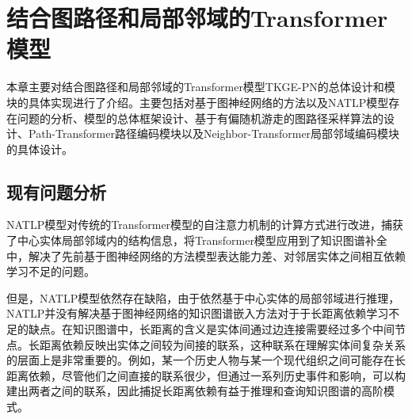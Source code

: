 \chapter{结合图路径和局部邻域的Transformer模型}

本章主要对结合图路径和局部邻域的Transformer模型TKGE-PN的总体设计和模块的具体实现进行了介绍。主要包括对基于图神经网络的方法以及NATLP模型存在问题的分析、模型的总体框架设计、基于有偏随机游走的图路径采样算法的设计、Path-Transformer路径编码模块以及Neighbor-Transformer局部邻域编码模块的具体设计。

\section{现有问题分析}
NATLP模型对传统的Transformer模型的自注意力机制的计算方式进行改进，捕获了中心实体局部邻域内的结构信息，将Transformer模型应用到了知识图谱补全中，解决了先前基于图神经网络的方法模型表达能力差、对邻居实体之间相互依赖学习不足的问题。

但是，NATLP模型依然存在缺陷，由于依然基于中心实体的局部邻域进行推理，NATLP并没有解决基于图神经网络的知识图谱嵌入方法对于于长距离依赖学习不足的缺点。在知识图谱中，长距离的含义是实体间通过边连接需要经过多个中间节点。长距离依赖反映出实体之间较为间接的联系，这种联系在理解实体间复杂关系的层面上是非常重要的。例如，某一个历史人物与某一个现代组织之间可能存在长距离依赖，尽管他们之间直接的联系很少，但通过一系列历史事件和影响，可以构建出两者之间的联系，因此捕捉长距离依赖有益于推理和查询知识图谱的高阶模式。

